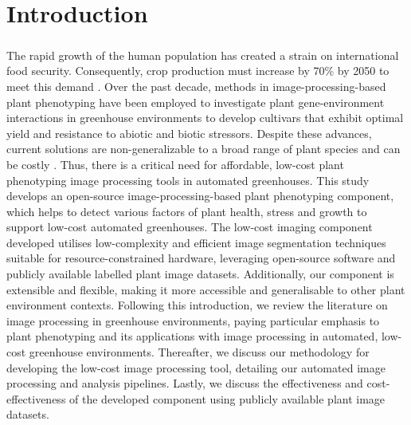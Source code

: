 \chapter{Introduction}

\paragraph{}
The rapid growth of the human population has created a strain on international food security. Consequently, crop production must increase by 70\% by 2050 to meet this demand \cite{carvajal-yepesGlobalSurveillanceSystem2019}. Over the past decade, methods in image-processing-based plant phenotyping have been employed to investigate plant gene-environment interactions in greenhouse environments to develop cultivars that exhibit optimal yield and resistance to abiotic and biotic stressors. Despite these advances, current solutions are non-generalizable to a broad range of plant species and can be costly \cite{arnalbarbedoDigitalImageProcessing2013, liReviewImagingTechniques2014, minerviniImageAnalysisNew2015}. Thus, there is a critical need for affordable, low-cost plant phenotyping image processing tools in automated greenhouses. This study develops an open-source image-processing-based plant phenotyping component, which helps to detect various factors of plant health, stress and growth to support low-cost automated greenhouses. The low-cost imaging component developed utilises low-complexity and efficient image segmentation techniques suitable for resource-constrained hardware, leveraging open-source software and publicly available labelled plant image datasets. Additionally, our component is extensible and flexible, making it more accessible and generalisable to other plant environment contexts. Following this introduction, we review the literature on image processing in greenhouse environments, paying particular emphasis to plant phenotyping and its applications with image processing in automated, low-cost greenhouse environments. Thereafter, we discuss our methodology for developing the low-cost image processing tool, detailing our automated image processing and analysis pipelines. Lastly, we discuss the effectiveness and cost-effectiveness of the developed component using publicly available plant image datasets.